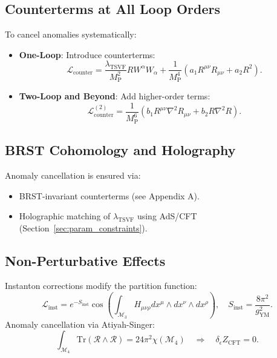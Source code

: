 \documentclass[12pt, onecolumn]{article}
\theoremstyle{definition}
\newcommand{\tsvf}{\lambda_{\mathrm{TSVF}}}
\newcommand{\Mp}{M_{\mathrm{P}}}
\numberwithin{equation}{section}
\begin{document}
\subsection{Counterterms at All Loop Orders}
To cancel anomalies systematically:
\begin{itemize}
\item \textbf{One-Loop}: Introduce counterterms:
\begin{equation}
\mathcal{L}_{\text{counter}} = \frac{\tsvf}{\Mp^2} R W^\alpha W_\alpha + \frac{1}{\Mp^4} \left(a_1 R^{\mu\nu} R_{\mu\nu} + a_2 R^2 \right).
\end{equation}

\item \textbf{Two-Loop and Beyond}: Add higher-order terms:
\begin{equation}
\mathcal{L}_{\text{counter}}^{(2)} = \frac{1}{\Mp^6} \left(b_1 R^{\mu\nu} \nabla^2 R_{\mu\nu} + b_2 R \nabla^2 R \right).
\end{equation}
\end{itemize}

\subsection{BRST Cohomology and Holography}
Anomaly cancellation is ensured via:
\begin{itemize}
\item BRST-invariant counterterms (see Appendix A).
\item Holographic matching of \(\tsvf\) using AdS/CFT (Section~\ref{sec:param_constraints}).
\end{itemize}

\subsection{Non-Perturbative Effects}  
\label{subsec:instantons}

Instanton corrections modify the partition function:  
\begin{equation}
\mathcal{L}_{\text{inst}} = e^{-S_{\text{inst}}} \cos\left(\int_{\mathcal{M}_3} H_{\mu\nu\rho} dx^\mu \wedge dx^\nu \wedge dx^\rho\right), \quad S_{\text{inst}} = \frac{8\pi^2}{g_{\text{YM}}^2}.
\end{equation}  
Anomaly cancellation via Atiyah-Singer:  
\begin{equation}
\int_{\mathcal{M}_4} \mathrm{Tr}(\mathcal{R} \wedge \mathcal{R}) = 24\pi^2 \chi(\mathcal{M}_4) \quad \Rightarrow \quad \delta_\epsilon Z_{\text{CFT}} = 0.
\end{equation}
\end{document}
